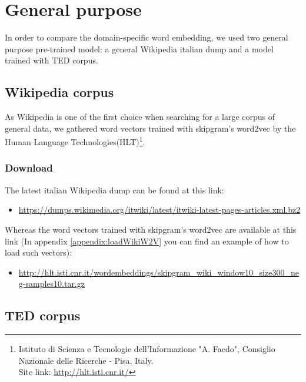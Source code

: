\section{General purpose}

In order to compare the domain-specific word embedding, we used two general purpose pre-trained model: a general Wikipedia italian dump and a model trained with TED corpus.

\subsection{Wikipedia corpus}
As Wikipedia is one of the first choice when searching for a large corpus of general data, we gathered word vectors trained with skipgram's word2vec by the
Human Language Technologies(HLT)\footnote{Istituto di Scienza e Tecnologie dell'Informazione "A. Faedo", Consiglio Nazionale delle Ricerche - Pisa, Italy.\\Site link:  \url{http://hlt.isti.cnr.it/}}.

\subsubsection{Download}
The latest italian Wikipedia dump can be found at this link:
\begin{itemize}
	\item \url{https://dumps.wikimedia.org/itwiki/latest/itwiki-latest-pages-articles.xml.bz2}
\end{itemize}
Whereas the word vectors trained with skipgram's word2vec are available at this link (In appendix \ref{appendix:loadWikiW2V} you can find an example of how to load such vectors):
\begin{itemize}
	\item \url{http://hlt.isti.cnr.it/wordembeddings/skipgram_wiki_window10_size300_neg-samples10.tar.gz}
\end{itemize}


\subsection{TED corpus}

